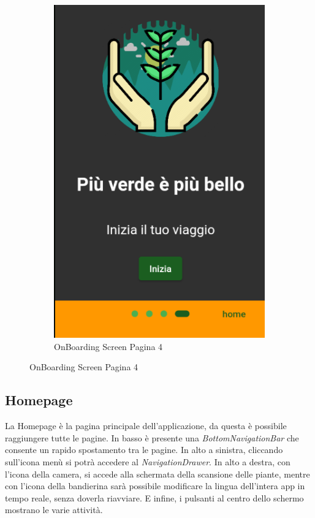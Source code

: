 \documentclass[a4paper,12pt]{report}
\begin{document}
\begin{figure}[H]
\begin{subfigure}{0.3\textwidth}
	\includegraphics[width=\textwidth]{./images/onboarding/onboarding_screen3_dark.png}
	\caption{OnBoarding Screen Pagina 4}
	\label{fig:onboarding3}
\end{subfigure}
\end{figure}

\subsection{Homepage}

\textsf{\small La Homepage è la pagina principale dell'applicazione, da questa è possibile raggiungere tutte le pagine.}
\textsf{\small In basso è presente una \emph{BottomNavigationBar} che consente un rapido spostamento tra le pagine.}
\textsf{\small In alto a sinistra, cliccando sull'icona menù si potrà accedere al \emph{NavigationDrawer}.}
\textsf{\small In alto a destra, con l'icona della camera, si accede alla schermata della scansione delle piante, mentre con l'icona della bandierina sarà possibile modificare la lingua dell'intera app in tempo reale, senza doverla riavviare.}
\textsf{\small E infine, i pulsanti al centro dello schermo mostrano le varie attività.}
\end{document}
